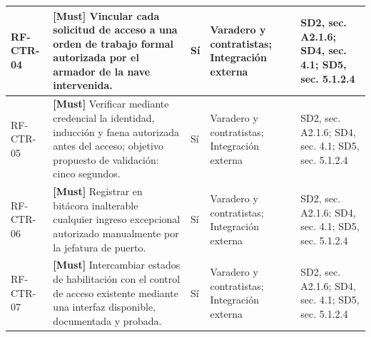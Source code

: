\begin{paginaHorizontalSynaptix}
\begin{longtable}{|L{0.09\AnchoMatrizTDoce}|L{0.385\AnchoMatrizTDoce}|L{0.065\AnchoMatrizTDoce}|L{0.18\AnchoMatrizTDoce}|L{0.28\AnchoMatrizTDoce}|}
RF-\allowbreak{}CTR-\allowbreak{}04 &
\textbf{[Must]} Vincular cada solicitud de acceso a una orden de trabajo formal autorizada por el armador de la nave intervenida. &
Sí &
Varadero y contratistas; Integración externa &
SD2, sec. A2.1.6; SD4, sec. 4.1; SD5, sec. 5.1.2.4 \\ \hline

RF-\allowbreak{}CTR-\allowbreak{}05 &
\textbf{[Must]} Verificar mediante credencial la identidad, inducción y faena autorizada antes del acceso; objetivo propuesto de validación: cinco segundos. &
Sí &
Varadero y contratistas; Integración externa &
SD2, sec. A2.1.6; SD4, sec. 4.1; SD5, sec. 5.1.2.4 \\ \hline

RF-\allowbreak{}CTR-\allowbreak{}06 &
\textbf{[Must]} Registrar en bitácora inalterable cualquier ingreso excepcional autorizado manualmente por la jefatura de puerto. &
Sí &
Varadero y contratistas; Integración externa &
SD2, sec. A2.1.6; SD4, sec. 4.1; SD5, sec. 5.1.2.4 \\ \hline

RF-\allowbreak{}CTR-\allowbreak{}07 &
\textbf{[Must]} Intercambiar estados de habilitación con el control de acceso existente mediante una interfaz disponible, documentada y probada. &
Sí &
Varadero y contratistas; Integración externa &
SD2, sec. A2.1.6; SD4, sec. 4.1; SD5, sec. 5.1.2.4 \\ \hline
\end{longtable}



\end{paginaHorizontalSynaptix}

